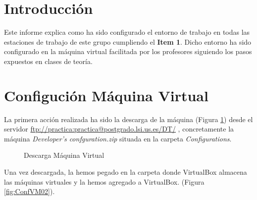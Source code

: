 \documentclass{scrartcl}
\begin{document}




\section{Introducción}
Este informe explica como ha sido configurado el entorno de trabajo en todas las estaciones de trabajo de este grupo cumpliendo el \textbf{Item 1}. Dicho entorno ha sido configurado en la máquina virtual facilitada por los profesores siguiendo los pasos expuestos en clases de teoría.
\section{Configución Máquina Virtual}
La primera acción realizada ha sido la descarga de la máquina  (Figura \ref{fig:ConfVM01}) desde el servidor \href{ftp://practica:practica@postgrado.lsi.us.es/DT/}{ftp://practica:practica@postgrado.lsi.us.es/DT/} , concretamente la máquina \textit{Developer's confguration.zip}  situada en la carpeta  \textit{Configurations}.

\begin{figure}[H]
	
	\centering
	\caption{Descarga Máquina Virtual}
	\label{fig:ConfVM01}
	
\end{figure}

Una vez descargada, la hemos pegado en la carpeta donde VirtualBox almacena las máquinas virtuales y la hemos agregado a VirtualBox. (Figura \ref{fig:ConfVM02}).
\end{document}
